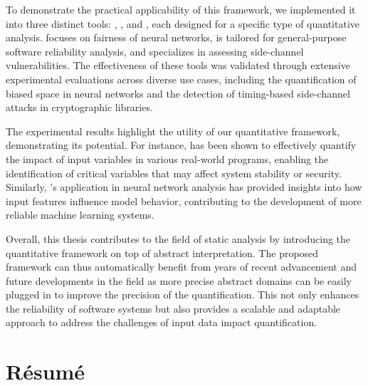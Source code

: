 To demonstrate the practical applicability of this framework, we implemented it into three distinct tools: \libra, \impatto, and \timesec, each designed for a specific type of quantitative analysis. \libra{} focuses on fairness of neural networks, \impatto{} is tailored for general-purpose software reliability analysis, and \timesec{} specializes in assessing side-channel vulnerabilities. The effectiveness of these tools was validated through extensive experimental evaluations across diverse use cases, including the quantification of biased space in neural networks and the detection of timing-based side-channel attacks in cryptographic libraries.

The experimental results highlight the utility of our quantitative framework, demonstrating its potential. For instance, \timesec{} has been shown to effectively quantify the impact of input variables in various real-world programs, enabling the identification of critical variables that may affect system stability or security. Similarly, \libra's application in neural network analysis has provided insights into how input features influence model behavior, contributing to the development of more reliable machine learning systems.

Overall, this thesis contributes to the field of static analysis by introducing the quantitative framework on top of abstract interpretation. The proposed framework can thus automatically benefit from years of recent advancement and future developments in the field as more precise abstract domains can be easily plugged in to improve the precision of the quantification. This not only enhances the reliability of software systems but also provides a scalable and adaptable approach to address the challenges of input data impact quantification.


\chapter*{Résumé}

